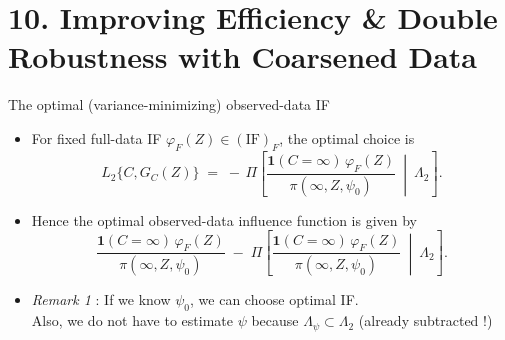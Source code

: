 \documentclass[xcolor=dvipsnames,aspectratio=169]{beamer}
\newcommand{\1}{\mathbbm{1}}
\begin{document}
\section{10. Improving Efficiency \& Double Robustness with Coarsened Data}

\begin{frame}{The optimal (variance-minimizing) observed-data IF}
    \begin{tcolorbox}[colframe=Cyan,title=Theorem 10.1]
  \begin{itemize}
    \item For fixed full-data IF $\varphi_F(Z)\in(\mathrm{IF})_F$, the optimal choice is
    \[
      L_2\{C,G_C(Z)\}
      \;=\;
      -\,\Pi\!\left[
        \frac{\mathbf{1}(C=\infty)\,\varphi_F(Z)}{\pi(\infty,Z,\psi_0)}
        \ \middle|\ \Lambda_2
      \right].
    \]
    \item Hence the optimal observed-data influence function is given by
    \[
      \frac{\mathbf{1}(C=\infty)\,\varphi_F(Z)}{\pi(\infty,Z,\psi_0)}
      \;-\;
      \Pi\!\left[
        \frac{\mathbf{1}(C=\infty)\,\varphi_F(Z)}{\pi(\infty,Z,\psi_0)}
        \ \middle|\ \Lambda_2
      \right].
    \]
  \end{itemize}
\end{tcolorbox}
\begin{itemize}
    \item \textit{Remark 1} : If we \alert{know $\psi_0$}, we can choose optimal IF. \\
    Also, we do not have to estimate $\psi$ because $\Lambda_{\psi}\subset \Lambda_2$ (already subtracted !)
\end{itemize}
\end{frame}
\end{document}
